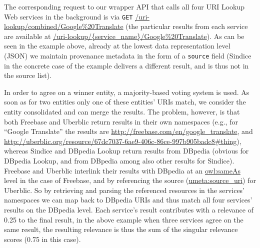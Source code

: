 \documentclass{acm_proc_article-sp}
\begin{document}

The corresponding request to our wrapper API that calls all four URI Lookup Web services in the background is via \texttt{GET} \url{/uri-lookup/combined/Google%20Translate} (the particular results from each service are available at \url{/uri-lookup/{service_name}/Google%

In order to agree on a winner entity, a majority-based voting system is used. As soon as for two entities only one of these entities' URIs match, we consider the entity consolidated and can merge the results. The problem, however, is that both Freebase and Uberblic return results in their own namespaces (e.g., for ``Google Translate'' the results are \url{http://freebase.com/en/google_translate}, and \url{http://uberblic.org/resource/67dc7037-6ae9-406c-86ce-997b905badc8#thing}), whereas Sindice and DBpedia Lookup return results from DBpedia (obvious for DBpedia Lookup, and from DBpedia among also other results for Sindice). Freebase and Uberblic interlink their results with DBpedia at an \url{owl:sameAs} level in the case of Freebase, and by referencing the source (\url{umeta:source_uri}) for Uberblic. So by retrieving and parsing the referenced resources in the services' namespaces we can map back to DBpedia URIs and thus match all four services' results on the DBpedia level. Each service's result contributes with a relevance of 0.25 to the final result, in the above example when three services agree on the same result, the resulting relevance is thus the sum of the singular relevance scores (0.75 in this case).
\end{document}

